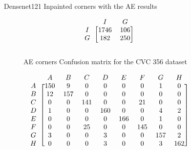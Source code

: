 \begin{figure}
\caption{Densenet121 Inpainted corners with the AE results}
\myfontsize
\caption*{\footnotesize \textmd{ \textbf{A}:{dyed-lifted-polyps} , \textbf{B}:{dyed-resection-margins} , \textbf{C}:{esophagitis} , \textbf{D}:{normal-cecum} , \textbf{E}:{normal-pylorus} , \textbf{F}:{normal-z-line} , \textbf{G}:{polyps} , \textbf{H}:{ulcerative-colitis} , \textbf{I}:{non-polyp}}}

\begin{subfigure}[b]{0.25\textwidth}
     
\[
\begin{blockarray}{ccc}
& I & G  \\
\begin{block}{c[cc]}
        I&1746 & 106\\
        G&  182 & 250\\
\end{block}
\end{blockarray}
 \]         

\caption{AE corners Confusion matrix for the CVC 356 dataset}
\label{mat:cvc356_CM_DN121_AE_CORNER}
\end{subfigure}
\begin{subfigure}[b]{0.49\textwidth}  
\scriptsize     
\[
\begin{blockarray}{ccccccccc}
& A & B & C & D & E & F & G & H \\
\begin{block}{c[cccccccc]}
A&150 & 9 & 0 & 0 & 0 & 0 & 1 & 0\\
B& 12 & 157 & 0 & 0 & 0 & 0 & 0 & 0\\
C&  0 & 0 & 141 & 0 & 0 & 21 & 0 & 0\\
D&  1 & 0 & 0 & 160 & 0 & 0 & 4 & 2\\
E&  0 & 0 & 0 & 0 & 166 & 0 & 1 & 0\\
F&  0 & 0 & 25 & 0 & 0 & 145 & 0 & 0\\
G&  3 & 0 & 0 & 3 & 0 & 0 & 157 & 2\\
H&  0 & 0 & 0 & 3 & 0 & 0 & 3 & 162\\
\end{block}
\end{blockarray}
 \]        
        

\end{subfigure}
\end{figure}
